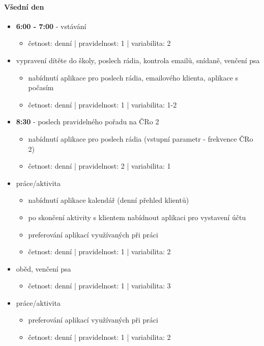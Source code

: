 \documentclass[thesis=M,czech]{FITthesis}[2012/06/26]
\begin{document}
\paragraph{Všední den}
\begin{itemize}
    \item \textbf{6:00 - 7:00} - vstávání
\begin{itemize}
        \item četnost: denní | pravidelnost: 1 | variabilita: 2
\end{itemize}
    \item vypravení dítěte do školy, poslech rádia, kontrola emailů, snídaně, venčení psa
\begin{itemize}
        \item nabídnutí aplikace pro poslech rádia, emailového klienta, aplikace s počasím
        \item četnost: denní | pravidelnost: 1 | variabilita: 1-2
\end{itemize}
    \item \textbf{8:30} - poslech pravidelného pořadu  na ČRo 2
\begin{itemize}
        \item nabídnutí aplikace pro poslech rádia (vstupní parametr - frekvence ČRo 2)
        \item četnost: denní | pravidelnost: 2 | variabilita: 1
\end{itemize}
    \item práce/aktivita
\begin{itemize}
        \item nabídnutí aplikace kalendář (denní přehled klientů)
        \item po skončení aktivity s klientem nabídnout aplikaci pro vystavení účtu
        \item preferování aplikací využívaných při práci
        \item četnost: denní | pravidelnost: 1 | variabilita: 2
\end{itemize}
    \item oběd, venčení psa
\begin{itemize}
        \item četnost: denní | pravidelnost: 1 | variabilita: 3
\end{itemize}
    \item práce/aktivita
\begin{itemize}
        \item preferování aplikací využívaných při práci
        \item četnost: denní | pravidelnost: 1 | variabilita: 2

\end{itemize}
\end{itemize}
\end{document}
